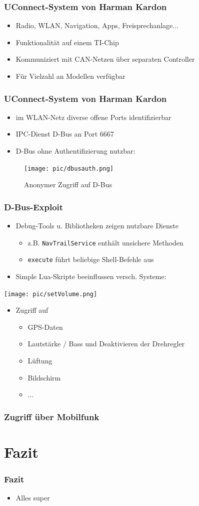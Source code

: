 \documentclass[t]{beamer}
\begin{document}
\begin{frame}
	\frametitle{UConnect-System von Harman Kardon}
    \begin{itemize}
    	\item Radio, WLAN, Navigation, Apps, Freisprechanlage...
        \item Funktionalität auf einem TI-Chip
        \item Kommuniziert mit CAN-Netzen über separaten Controller
        \item Für Vielzahl an Modellen verfügbar
    \end{itemize}
\end{frame}

\begin{frame}
	\frametitle{UConnect-System von Harman Kardon}
    \begin{itemize}
    	\item im WLAN-Netz diverse offene Ports identifizierbar
    	\item IPC-Dienst D-Bus an Port 6667
    	\item D-Bus ohne Authentifizierung nutzbar:
   	\end{itemize}
    \begin{figure}
    \texttt{[image: pic/dbusauth.png]}
    \caption{Anonymer Zugriff auf D-Bus}
    \end{figure}
\end{frame}

\begin{frame}
	\frametitle{D-Bus-Exploit}
	\begin{itemize}
    	\item Debug-Tools u. Bibliotheken zeigen nutzbare Dienste
        \begin{itemize}
        \item z.B. \texttt{NavTrailService} enthält unsichere Methoden
        \item \texttt{execute} führt beliebige Shell-Befehle aus
        \end{itemize}
        \item Simple Lua-Skripte beeinflussen versch. Systeme:
    \end{itemize}
    \texttt{[image: pic/setVolume.png]}
    \begin{itemize}
    \item Zugriff auf
    \begin{itemize}
    \item GPS-Daten
    \item Lautstärke / Bass und Deaktivieren der Drehregler
    \item Lüftung
    \item Bildschirm
    \item ...
    \end{itemize}
    \end{itemize}
\end{frame}

\begin{frame}
	\frametitle{Zugriff über Mobilfunk}
\end{frame}
\section{Fazit}
\begin{frame}
	\frametitle{Fazit}
	\begin{itemize}
		\item Alles super
	\end{itemize}
\end{frame}
\end{document}
